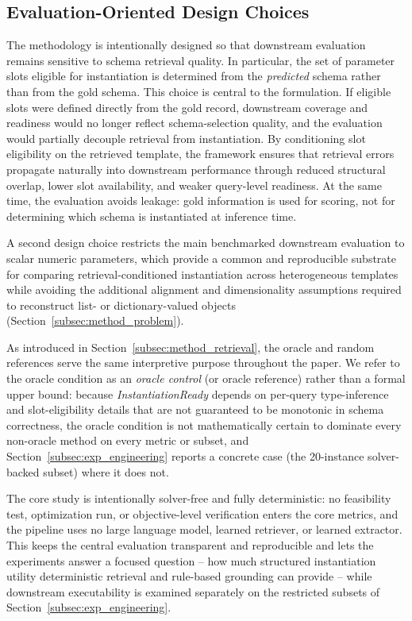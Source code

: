 \documentclass[pdflatex,sn-basic,Numbered]{sn-jnl}
\begin{document}
\subsection{Evaluation-Oriented Design Choices}
\label{subsec:method_design}

The methodology is intentionally designed so that downstream evaluation remains sensitive to schema retrieval quality. In particular, the set of parameter slots eligible for instantiation is determined from the \emph{predicted} schema rather than from the gold schema. This choice is central to the formulation. If eligible slots were defined directly from the gold record, downstream coverage and readiness would no longer reflect schema-selection quality, and the evaluation would partially decouple retrieval from instantiation. By conditioning slot eligibility on the retrieved template, the framework ensures that retrieval errors propagate naturally into downstream performance through reduced structural overlap, lower slot availability, and weaker query-level readiness. At the same time, the evaluation avoids leakage: gold information is used for scoring, not for determining which schema is instantiated at inference time.

A second design choice restricts the main benchmarked downstream evaluation to scalar numeric parameters, which provide a common and reproducible substrate for comparing retrieval-conditioned instantiation across heterogeneous templates while avoiding the additional alignment and dimensionality assumptions required to reconstruct list- or dictionary-valued objects (Section~\ref{subsec:method_problem}).

As introduced in Section~\ref{subsec:method_retrieval}, the oracle and random references serve the same interpretive purpose throughout the paper. We refer to the oracle condition as an \emph{oracle control} (or oracle reference) rather than a formal upper bound: because \textit{InstantiationReady} depends on per-query type-inference and slot-eligibility details that are not guaranteed to be monotonic in schema correctness, the oracle condition is not mathematically certain to dominate every non-oracle method on every metric or subset, and Section~\ref{subsec:exp_engineering} reports a concrete case (the 20-instance solver-backed subset) where it does not.

The core study is intentionally solver-free and fully deterministic: no feasibility test, optimization run, or objective-level verification enters the core metrics, and the pipeline uses no large language model, learned retriever, or learned extractor. This keeps the central evaluation transparent and reproducible and lets the experiments answer a focused question -- how much structured instantiation utility deterministic retrieval and rule-based grounding can provide -- while downstream executability is examined separately on the restricted subsets of Section~\ref{subsec:exp_engineering}.
\end{document}
